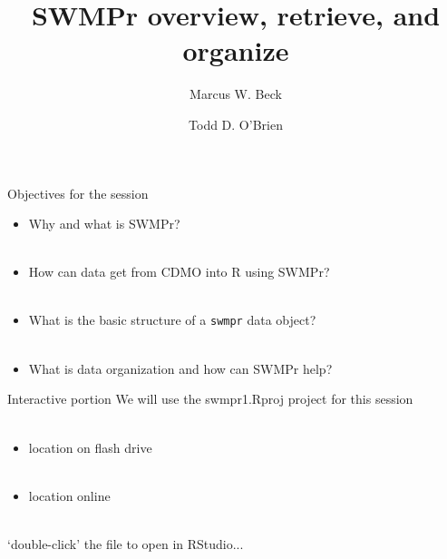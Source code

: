 \documentclass[xcolor=dvipsnames]{beamer}\usepackage[]{graphicx}\usepackage[]{color}
\begin{document}
\title[SWMPr overview, retrieve, and organize]{SWMPr overview, retrieve, and organize}

\author[M. Beck, T. O'Brien]{Marcus W. Beck \and Todd D. O'Brien}

\date{}







\begin{frame}{Objectives for the session}
\begin{itemize}
\item Why and what is SWMPr?\\~\\
\item How can data get from CDMO into R using SWMPr? \\~\\
\item What is the basic structure of a \texttt{swmpr} data object?\\~\\
\item What is data organization and how can SWMPr help?
\end{itemize}
\end{frame}

\begin{frame}{Interactive portion}
We will use the swmpr1.Rproj project for this session \\~\\
\begin{itemize}
\item location on flash drive\\~\\
\item location online \\~\\
\end{itemize}
`double-click' the file to open in RStudio...
\end{frame}
\end{document}
